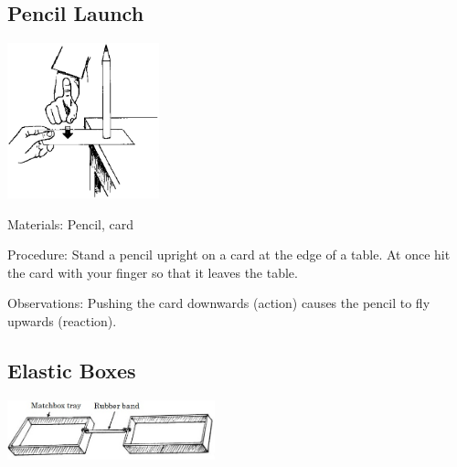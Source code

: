 \begin{multicols}{2}
\subsection{Pencil Launch}

\begin{center}
\includegraphics[width=0.33\textwidth]{./img/source/pencil-launch.png}
\end{center}

\begin{description*}
\item[Materials:]{Pencil, card}
\item[Procedure:]{Stand a pencil upright on a card at the edge of a table. At once hit the card with your finger so that it leaves the table.}
\item[Observations:]{Pushing the card downwards (action) causes the pencil to fly upwards (reaction).}
\end{description*}

\columnbreak

\subsection{Elastic Boxes}

\begin{center}
\includegraphics[width=0.45\textwidth]{./img/n3-matchbox.jpg}
\end{center}


\end{multicols}
